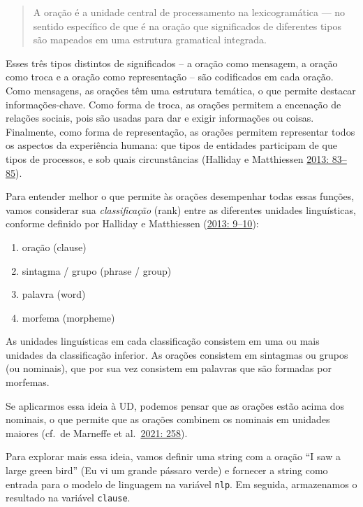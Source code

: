 \documentclass[
  brazilian,
]{article}
\providecommand{\tightlist}{%
  \setlength{\itemsep}{0pt}\setlength{\parskip}{0pt}}
\begin{document}
\begin{quote}
A oração é a unidade central de processamento na lexicogramática --- no
sentido específico de que é na oração que significados de diferentes
tipos são mapeados em uma estrutura gramatical integrada.
\end{quote}

Esses três tipos distintos de significados -- a oração como mensagem, a
oração como troca e a oração como representação -- são codificados em
cada oração. Como mensagens, as orações têm uma estrutura temática, o
que permite destacar informações-chave. Como forma de troca, as orações
permitem a encenação de relações sociais, pois são usadas para dar e
exigir informações ou coisas. Finalmente, como forma de representação,
as orações permitem representar todos os aspectos da experiência humana:
que tipos de entidades participam de que tipos de processos, e sob quais
circunstâncias (Halliday e Matthiessen
\href{https://doi.org/10.4324/9780203431269}{2013: 83--85}).

Para entender melhor o que permite às orações desempenhar todas essas
funções, vamos considerar sua \emph{classificação} (rank) entre as
diferentes unidades linguísticas, conforme definido por Halliday e
Matthiessen (\href{https://doi.org/10.4324/9780203431269}{2013: 9--10}):

\begin{enumerate}
\def\labelenumi{\arabic{enumi}.}
\tightlist
\item
  oração (clause)
\item
  sintagma / grupo (phrase / group)
\item
  palavra (word)
\item
  morfema (morpheme)
\end{enumerate}

As unidades linguísticas em cada classificação consistem em uma ou mais
unidades da classificação inferior. As orações consistem em sintagmas ou
grupos (ou nominais), que por sua vez consistem em palavras que são
formadas por morfemas.

Se aplicarmos essa ideia à UD, podemos pensar que as orações estão acima
dos nominais, o que permite que as orações combinem os nominais em
unidades maiores (cf.~de Marneffe et
al.~\href{https://doi.org/10.1162/coli_a_00402}{2021: 258}).

Para explorar mais essa ideia, vamos definir uma string com a oração ``I
saw a large green bird'' (Eu vi um grande pássaro verde) e fornecer a
string como entrada para o modelo de linguagem na variável \texttt{nlp}.
Em seguida, armazenamos o resultado na variável \texttt{clause}.
\end{document}
